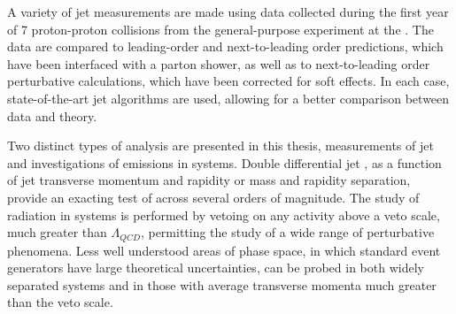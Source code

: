 A variety of jet measurements are made using data collected during the first
year of \unit{7}{\TeV} proton-proton collisions from the general-purpose \ATLAS
experiment at the \LHC. The data are compared to leading-order and next-to-leading
order \MC predictions, which have been interfaced with a parton shower, as well
as to next-to-leading order perturbative \QCD calculations, which have been
corrected for soft effects. In each case, state-of-the-art jet algorithms are
used, allowing for a better comparison between data and theory.

Two distinct types of analysis are presented in this thesis, measurements of jet
 and investigations of \QCD emissions in \dijet systems. Double
differential jet , as a function of jet transverse momentum and rapidity
or \dijet mass and rapidity separation, provide an exacting test of \QCD across
several orders of magnitude. The study of \QCD radiation in \dijet systems is
performed by vetoing on any \QCD activity above a veto scale, \Qnought much
greater than $\Lambda_{QCD}$, permitting the study of a wide range of
perturbative \QCD phenomena. Less well understood areas of phase space, in which
standard event generators have large theoretical uncertainties, can be probed in
both widely separated \dijet systems and in those with average transverse
momenta much greater than the veto scale.
